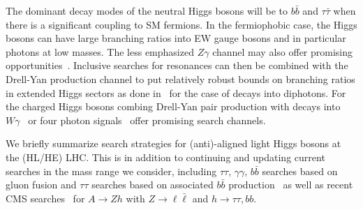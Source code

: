 \documentclass[../report.tex]{subfiles}
\begin{document}
The dominant decay modes of the neutral Higgs bosons will be to $b\bar{b}$ and $\tau\bar{\tau}$ when there is a significant coupling to SM fermions. In the fermiophobic case, the Higgs bosons can have large branching ratios into EW gauge bosons and in particular photons at low masses. The less emphasized $Z\gamma$ channel may also offer promising opportunities~\cite{Degrande:2017naf}. Inclusive searches for resonances can then be combined with the Drell-Yan production channel to put relatively robust bounds on branching ratios in extended Higgs sectors as done in~\cite{Delgado:2016arn,Vega:2018ddp} for the case of decays into diphotons. For the charged Higgs bosons combing Drell-Yan pair production with decays into $W\gamma$~\cite{Ilisie:2014hea,Degrande:2017naf} or four photon signals~\cite{Aaltonen:2016fnw} offer promising search channels.



We briefly summarize search strategies for (anti)-aligned light
Higgs bosons at the (HL/HE) LHC. This is in addition to continuing
and updating current searches in the mass range we consider, including
$\tau\tau,\,\gamma\gamma,\,b\bar{b}$ searches based on gluon fusion and
$\tau\tau$ searches based on associated $b\bar{b}$
production~\cite{Aad:2014vgg,Khachatryan:2014wca,Khachatryan:2015baw} as
well as recent CMS searches~\cite{CMS:2015mba} for $A \to Zh$ with $Z
\to \ell\bar\ell$ and $h\to \tau\tau, bb$.  

\end{document}
